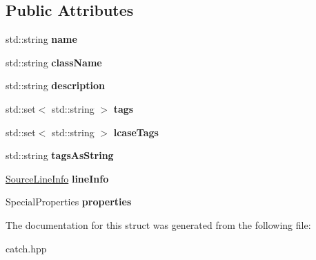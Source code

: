 \subsection*{Public Attributes}
\begin{DoxyCompactItemize}
\item 
\hypertarget{structCatch_1_1TestCaseInfo_a463794e2f5cfead307c93efd134ade36}{
std::string {\bfseries name}}
\label{structCatch_1_1TestCaseInfo_a463794e2f5cfead307c93efd134ade36}

\item 
\hypertarget{structCatch_1_1TestCaseInfo_a1a5e0825132a38d091defdebbf2f8ce9}{
std::string {\bfseries className}}
\label{structCatch_1_1TestCaseInfo_a1a5e0825132a38d091defdebbf2f8ce9}

\item 
\hypertarget{structCatch_1_1TestCaseInfo_a37fe2db9425bc45f6a33893eac31198e}{
std::string {\bfseries description}}
\label{structCatch_1_1TestCaseInfo_a37fe2db9425bc45f6a33893eac31198e}

\item 
\hypertarget{structCatch_1_1TestCaseInfo_a045f62e7719a8760a5b456f7fd2dc97c}{
std::set$<$ std::string $>$ {\bfseries tags}}
\label{structCatch_1_1TestCaseInfo_a045f62e7719a8760a5b456f7fd2dc97c}

\item 
\hypertarget{structCatch_1_1TestCaseInfo_a0ed3864a313e8ddc3ae38431be5be9ae}{
std::set$<$ std::string $>$ {\bfseries lcaseTags}}
\label{structCatch_1_1TestCaseInfo_a0ed3864a313e8ddc3ae38431be5be9ae}

\item 
\hypertarget{structCatch_1_1TestCaseInfo_ac65c2d36fd36f71e9bf782b2ea245c64}{
std::string {\bfseries tagsAsString}}
\label{structCatch_1_1TestCaseInfo_ac65c2d36fd36f71e9bf782b2ea245c64}

\item 
\hypertarget{structCatch_1_1TestCaseInfo_aa9407b7f442655b51a2aad24b3fa2fd3}{
\hyperlink{structCatch_1_1SourceLineInfo}{SourceLineInfo} {\bfseries lineInfo}}
\label{structCatch_1_1TestCaseInfo_aa9407b7f442655b51a2aad24b3fa2fd3}

\item 
\hypertarget{structCatch_1_1TestCaseInfo_afc1e84bd7a2e180895a06d9131302af0}{
SpecialProperties {\bfseries properties}}
\label{structCatch_1_1TestCaseInfo_afc1e84bd7a2e180895a06d9131302af0}

\end{DoxyCompactItemize}


The documentation for this struct was generated from the following file:\begin{DoxyCompactItemize}
\item 
catch.hpp\end{DoxyCompactItemize}
